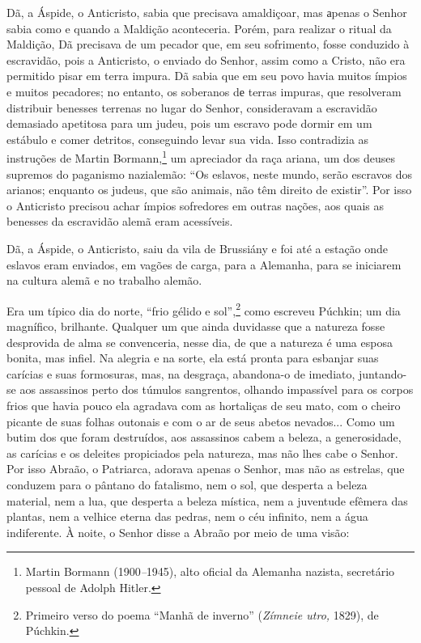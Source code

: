 Dã, a Áspide, o Anticristo, sabia que precisava amaldiçoar, mas аpenas o
Senhor sabia como e quando a Maldição aconteceria. Porém, para realizar
o ritual da Maldição, Dã precisava de um pecador que, em seu sofrimento,
fosse conduzido à escravidão, pois a Anticristo, o enviado do Senhor,
assim como a Cristo, não era permitido pisar em terra impura. Dã sabia
que em seu povo havia muitos ímpios e muitos pecadores; no entanto, os
soberanos dе terras impuras, que resolveram distribuir benesses terrenas
no lugar do Senhor, consideravam a escravidão demasiado apetitosa para
um judeu, pois um escravo pode dormir em um estábulo e comer detritos,
conseguindo levar sua vida. Isso contradizia as instruções de Martin
Bormann,\footnote{Martin Bormann (1900\emph{--}1945), alto oficial da
  Alemanha nazista, secretário pessoal de Adolph Hitler.} um apreciador
da raça ariana, um dos deuses supremos do paganismo nazialemão: ``Os
eslavos, neste mundo, serão escravos dos arianos; enquanto os judeus,
que são animais, não têm direito de existir''. Por isso o Anticristo
precisou achar ímpios sofredores em outras nações, aos quais as benesses
da escravidão alemã eram acessíveis.

Dã, a Áspide, o Anticristo, saiu da vila de Brussiány e foi até a
estação onde eslavos eram enviados, em vagões de carga, para a Alemanha,
para se iniciarem na cultura alemã e no trabalho alemão.

Era um típico dia do norte, ``frio gélido e sol'',\footnote{Primeiro
  verso do poema ``Manhã de inverno'' (\emph{Zímneie utro,} 1829), de
  Púchkin.} como escreveu Púchkin; um dia magnífico, brilhante. Qualquer
um que ainda duvidasse que a natureza fosse desprovida de alma se
convenceria, nesse dia, de que a natureza é uma esposa bonita, mas
infiel. Na alegria e na sorte, ela está pronta para esbanjar suas
carícias e suas formosuras, mas, na desgraça, abandona-o de imediato,
juntando-se aos assassinos perto dos túmulos sangrentos, olhando
impassível para os corpos frios que havia pouco ela agradava com as
hortaliças de seu mato, com o cheiro picante de suas folhas outonais e
com o ar de seus abetos nevados... Como um butim dos que foram
destruídos, aos assassinos cabem a beleza, a generosidade, as carícias e
os deleites propiciados pela natureza, mas não lhes cabe o Senhor. Por
isso Abraão, o Patriarca, adorava apenas o Senhor, mas não as estrelas,
que conduzem para o pântano do fatalismo, nem o sol, que desperta a
beleza material, nem a lua, que desperta a beleza mística, nem a
juventude efêmera das plantas, nem a velhice eterna das pedras, nem o
céu infinito, nem a água indiferente. À noite, o Senhor disse a Abraão
por meio de uma visão:

